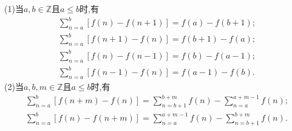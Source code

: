 \documentclass[../../main.tex]{subfiles}%
\begin{document}
\begin{theorem}[基本结论]\label{theorem:裂项求和基本结论}
(1)当$a,b\in \mathbb{Z}$且$a\leqslant  b$时,有
\begin{gather*}
\sum\limits_{n=a}^b{\left[ f\left( n \right) -f\left( n+1 \right) \right] =f\left( a \right) -f\left( b+1 \right)};
\\
\sum\limits_{n=a}^b{\left[ f\left( n+1 \right) -f\left( n \right) \right] =f\left( b+1 \right) -f\left( a \right)};
\\
\sum\limits_{n=a}^b{\left[ f\left( n \right) -f\left( n-1 \right) \right]}=f\left( b \right) -f\left( a-1 \right) ;
\\
\sum\limits_{n=a}^b{\left[ f\left( n-1 \right) -f\left( n \right) \right]}=f\left( a-1 \right) -f\left( b \right) .
\end{gather*}
(2)当$a,b,m\in \mathbb{Z}$且$a\leqslant  b$时,有
\begin{gather}\label{equation:隔m项的裂项求和式1}
\sum\limits_{n=a}^b{\left[ f\left( n+m \right) -f\left( n \right) \right] =\sum\limits_{n=b+1}^{b+m}{f\left( n \right)}-\sum\limits_{n=a}^{a+m-1}{f\left( n \right)}};
\\\label{equation:隔m项的裂项求和式2}
\sum\limits_{n=a}^b{\left[ f\left( n \right) -f\left( n+m \right) \right] =\sum\limits_{n=a}^{a+m-1}{f\left( n \right)}-\sum\limits_{n=b+1}^{b+m}{f\left( n \right)}}.
\end{gather}
\end{theorem}
\end{document}
